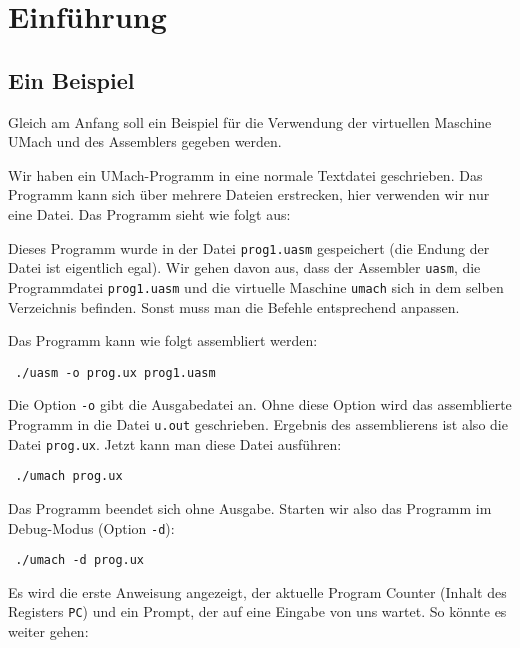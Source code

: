 \section{Einführung}

\subsection{Ein Beispiel}
Gleich am Anfang soll ein Beispiel für die Verwendung der
virtuellen Maschine UMach und des Assemblers gegeben werden.

Wir haben ein UMach-Programm in eine normale Textdatei geschrieben. Das Programm
kann sich über mehrere Dateien erstrecken, hier verwenden wir nur eine Datei.
Das Programm sieht wie folgt aus:



Dieses Programm wurde in der Datei \texttt{prog1.uasm} gespeichert (die Endung
der Datei ist eigentlich egal). Wir gehen davon aus, dass der Assembler
\texttt{uasm}, die Programmdatei \texttt{prog1.uasm} und die virtuelle Maschine
\texttt{umach} sich in dem selben Verzeichnis befinden. Sonst muss man die
Befehle entsprechend anpassen.

Das Programm kann wie folgt assembliert werden:
\begin{lstlisting}
 ./uasm -o prog.ux prog1.uasm
\end{lstlisting}

Die Option \texttt{-o} gibt die Ausgabedatei an. Ohne diese Option wird das
assemblierte Programm in die Datei \texttt{u.out} geschrieben. Ergebnis des
assemblierens ist also die Datei \texttt{prog.ux}. Jetzt kann man diese Datei
\glqq ausführen\grqq:
\begin{lstlisting}
 ./umach prog.ux
\end{lstlisting}
Das Programm beendet sich ohne Ausgabe. Starten wir also das Programm im
Debug-Modus (Option \texttt{-d}):
\begin{lstlisting}
 ./umach -d prog.ux
\end{lstlisting}

Es wird die erste Anweisung angezeigt, der aktuelle Program Counter (Inhalt
des Registers \texttt{PC}) und ein Prompt, der auf eine Eingabe von uns wartet.
So könnte es weiter gehen:


